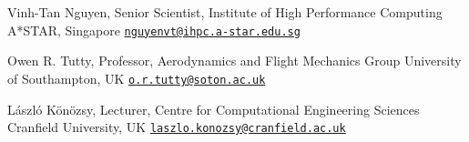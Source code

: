 \documentclass[line]{res}
\newenvironment{p1}
  {\begin{adjustwidth}{-16pt}{0pt}
  \vspace{1pt}}
  {\end{adjustwidth}}
\begin{document}
\begin{resume}
\begin{p1}
Vinh-Tan Nguyen, Senior Scientist, Institute of High Performance Computing\newline
A*STAR, Singapore\newline
\href{mailto:nguyenvt@ihpc.a-star.edu.sg}{\texttt{nguyenvt@ihpc.a-star.edu.sg}}

Owen R. Tutty, Professor, Aerodynamics and Flight Mechanics Group\newline
University of Southampton, UK\newline
\href{mailto:o.r.tutty@soton.ac.uk}{\texttt{o.r.tutty@soton.ac.uk}}

L\'{a}szl\'{o} K\"{o}n\"{o}zsy, Lecturer, Centre for Computational Engineering Sciences\newline
Cranfield University, UK\newline
\href{mailto:laszlo.konozsy@cranfield.ac.uk}{\texttt{laszlo.konozsy@cranfield.ac.uk}}
\end{p1}
\end{resume}
\end{document}

